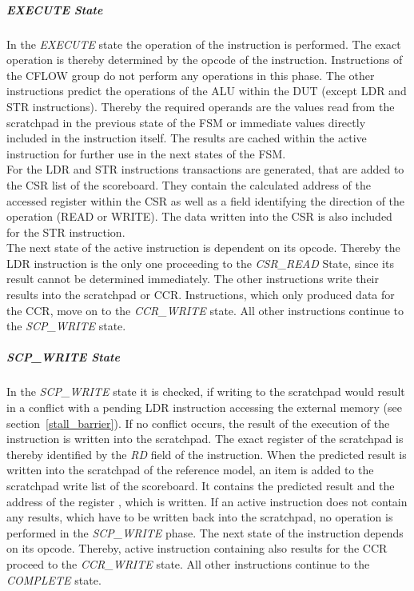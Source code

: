 \subparagraph{EXECUTE State}

In the \emph{EXECUTE} state the operation of the instruction is performed.
The exact operation is thereby determined by the opcode of the instruction.
Instructions of the CFLOW group do not perform any operations in this phase.
The other instructions predict the operations of the ALU within the DUT (except LDR and STR instructions).
Thereby the required operands are the values read from the scratchpad in the previous state of the FSM or immediate values directly included in the instruction
itself.
The results are cached within the active instruction for further use in the next states of the FSM.\\
For the LDR and STR instructions transactions are generated, that are added to the CSR list of the scoreboard.
They contain the calculated address of the accessed register within the CSR as well as a field identifying the direction of the operation (READ or WRITE).
The data written into the CSR is also included for the STR instruction.\\
The next state of the active instruction is dependent on its opcode.
Thereby the LDR instruction is the only one proceeding to the \emph{CSR\_READ} State, since its result cannot be determined immediately.
The other instructions write their results into the scratchpad or CCR.
Instructions, which only produced data for the CCR, move on to the \emph{CCR\_WRITE} state.
All other instructions continue to the \emph{SCP\_WRITE} state.

\subparagraph{SCP\_WRITE State}

In the \emph{SCP\_WRITE} state it is checked, if writing to the scratchpad would result in a conflict with a pending LDR instruction accessing the external
memory (see section~\ref{stall_barrier}).
If no conflict occurs, the result of the execution of the instruction is written into the scratchpad.
The exact register of the scratchpad is thereby identified by the \emph{RD} field of the instruction.
When the predicted result is written into the scratchpad of the reference model, an item is added to the scratchpad write list of the scoreboard.
It contains the predicted result and the address of the register , which is written.
If an active instruction does not contain any results, which have to be written back into the scratchpad, no operation is performed in the \emph{SCP\_WRITE}
phase.
The next state of the instruction depends on its opcode.
Thereby, active instruction containing also results for the CCR proceed to the \emph{CCR\_WRITE} state.
All other instructions continue to the \emph{COMPLETE} state.


